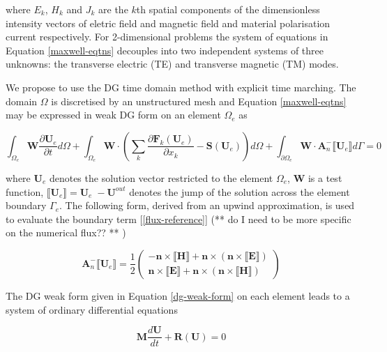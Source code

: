 \documentclass[times,11pt]{ACME2015article}
\newcommand{\mb}[1]{\boldsymbol{#1}}
\begin{document}
\begin{normalsize}
where $E_k$, $H_k$ and $J_k$ are the $k$th spatial components of the dimensionless intensity vectors of eletric field and magnetic field and material polarisation current respectively. For 2-dimensional problems the system of equations in Equation \ref{maxwell-eqtns} decouples into two independent systems of three unknowns: the transverse electric (TE) and transverse magnetic (TM) modes.

We propose to use the DG time domain method with explicit time marching. The domain $\Omega$ is discretised by an unstructured mesh and Equation \ref{maxwell-eqtns} may be expressed in weak DG form on an element $\Omega_e$ as

\begin{equation}\label{dg-weak-form}
\int_{\Omega_e} \mb{W} \frac{\partial \mb{U}_e}{\partial t} d\Omega  + \int_{\Omega_e} \mb{W} \cdot \left(  \sum_k \frac{\partial \mb{F}_k(\mb{U}_e)}{\partial x_k} -  \mb{S}(\mb{U}_e) \right) d\Omega + \int_{\partial \Omega_e} \mb{W} \cdot \mb{A}_n^{-} \llbracket \mb{U}_e \rrbracket d\Gamma = 0
\end{equation}

where $\bm{U}_e$ denotes the solution vector restricted to the element $\Omega_e$, $\bm{W}$ is a test function,  $\llbracket \bm{U}_e \rrbracket = \bm{U}_e 􏰇- \bm{U}^{out}$ denotes the jump of the solution across the element boundary $\Gamma_e$. The following form, derived from an upwind approximation, is used to evaluate the boundary term [\ref{flux-reference}] (** do I need to be more specific on the numerical flux?? ** )

\begin{equation}
\mb{A}_n^{-} \llbracket \mb{U}_e \rrbracket = \frac{1}{2}
  \begin{pmatrix}
    - \mb{n} \times \llbracket \mb{H} \rrbracket  + \mb{n} \times ( \mb{n} \times \llbracket \mb{E} \rrbracket ) \\
    \mb{n} \times \llbracket \mb{E} \rrbracket  + \mb{n} \times ( \mb{n} \times \llbracket \mb{H} \rrbracket )
  \end{pmatrix}
\end{equation}

The DG weak form given in Equation \ref{dg-weak-form} on each element leads to a system of ordinary differential equations

\begin{equation}\label{eqtn-sys}
\mb{M} \frac{ d\mb{U}}{dt} + \mb{R}(\mb{U}) = 0
\end{equation}


\end{normalsize}
\end{document}
